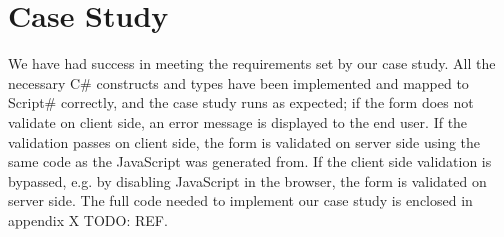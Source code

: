 \section{Case Study} %
\label{sec:reflection_on_case_study}

	We have had success in meeting the requirements set by our case study. All the necessary C\# constructs and types have been implemented and mapped to Script\# correctly, and the case study runs as expected; if the form does not validate on client side, an error message is displayed to the end user. If the validation passes on client side, the form is validated on server side using the same code as the JavaScript was generated from. If the client side validation is bypassed, e.g. by disabling JavaScript in the browser, the form is validated on server side. The full code needed to implement our case study is enclosed in appendix X TODO: REF.







